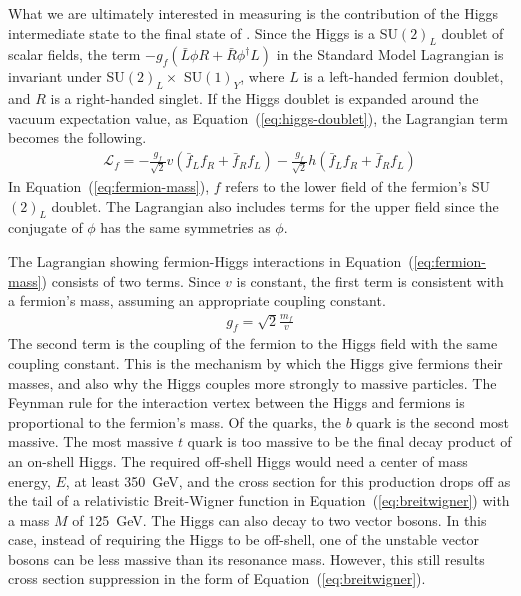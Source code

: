 What we are ultimately interested in measuring is the contribution of the
Higgs intermediate state to the final state of \bb.
Since the Higgs is a SU$(2)_L$ doublet of scalar fields,
the term $-g_f(\bar{L}\phi R + \bar{R} \phi^\dagger L)$ in the
Standard Model Lagrangian is invariant under SU$(2)_L \times$ SU$(1)_Y$,
where $L$ is a left-handed fermion doublet, and $R$ is a right-handed singlet.
If the Higgs doublet is expanded around the vacuum expectation value,
as Equation~(\ref{eq:higgs-doublet}), the Lagrangian term becomes the following.
\begin{gather}
  \mathcal{L}_f =
  -\frac{g_f}{\sqrt2} v \left(\bar{f}_L f_R + \bar{f}_R f_L \right)
  -\frac{g_f}{\sqrt2} h \left(\bar{f}_L f_R + \bar{f}_R f_L \right)
  \label{eq:fermion-mass}
\end{gather}
In Equation~(\ref{eq:fermion-mass}),
$f$ refers to the lower field of the fermion's SU$(2)_L$ doublet.
The Lagrangian also includes terms for the upper field since the conjugate of $\phi$
has the same symmetries as $\phi$.

The Lagrangian showing fermion-Higgs interactions in
Equation~(\ref{eq:fermion-mass}) consists of two terms.
Since $v$ is constant, the first term is consistent with a fermion's mass,
assuming an appropriate coupling constant.
\begin{gather}
  g_f = \sqrt2 \frac{m_f}{v}
\end{gather}
The second term is the coupling of the fermion to the Higgs field
with the same coupling constant.
This is the mechanism by which the Higgs give fermions their masses,
and also why the Higgs couples more strongly to massive particles.
The Feynman rule for the interaction vertex between the Higgs and fermions
is proportional to the fermion's mass.
Of the quarks, the $b$ quark is the second most massive.
The most massive $t$ quark is too massive to be the final decay product of an on-shell Higgs.
The required off-shell Higgs would need a center of mass energy, $E$, at least \SI{350}{GeV},
and the cross section for this production drops off as the tail of a relativistic Breit-Wigner function
in Equation~(\ref{eq:breitwigner}) with a mass $M$ of \SI{125}{GeV}.
The Higgs can also decay to two vector bosons.
In this case, instead of requiring the Higgs to be off-shell,
one of the unstable vector bosons can be less massive than its resonance mass.
However, this still results cross section suppression in the form of Equation~(\ref{eq:breitwigner}).

